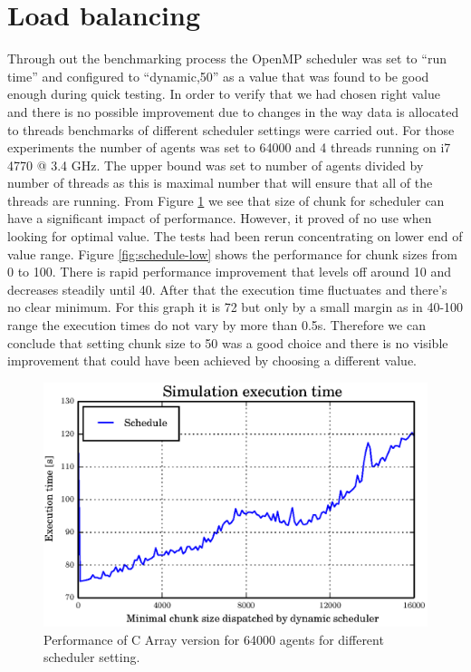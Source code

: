 \documentclass[12pt, a4paper]{report}
\begin{document}
\section{Load balancing}\label{sec:eval-load-balance}
Through out the benchmarking process the OpenMP scheduler was set to ``run time''
and configured to ``dynamic,50'' as a value that was found to be good enough
during quick testing. In order to verify that we had chosen right value
and there is no possible improvement due to changes in the way data is
allocated to threads benchmarks of different scheduler settings were carried
out. For those experiments the number of agents was set to 64000 and 4 threads
running on i7 4770 @ 3.4 GHz. The upper bound was set to number of agents
divided by number of threads as this is maximal number that will ensure that
all of the threads are running. From Figure \ref{fig:schedule-high} we see
that size of chunk for scheduler can have a significant impact of performance.
However, it proved of no use when looking for optimal value. The tests had
been rerun concentrating on lower end of value range. Figure \ref{fig:schedule-low}
shows the performance for chunk sizes from 0 to 100. There is rapid performance
improvement that levels off around 10 and decreases steadily until 40. After
that the execution time fluctuates and there's no clear minimum. For this
graph it is 72 but only by a small margin as in 40-100 range the execution
times do not vary by more than 0.5s. Therefore we can conclude that setting
chunk size to 50 was a good choice and there is no visible improvement that
could have been achieved by choosing a different value.

\begin{figure}[H]
  \begin{center}
    \includegraphics[width=\columnwidth]{graphs/schedule-high.eps}
    \caption{Performance of C Array version for 64000 agents for different scheduler setting.}
    \label{fig:schedule-high}
  \end{center}
\end{figure}
\end{document}
